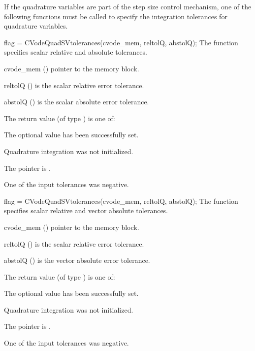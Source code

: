 If the quadrature variables are part of the step size control mechanism, 
one of the following functions must be called to specify the
integration tolerances for quadrature variables. 

{
 flag = CVodeQuadSVtolerances(cvode\_mem, reltolQ, abstolQ);
}
{
  The function  specifies scalar relative and absolute
  tolerances.
}
{
  \begin{args}
  \item[cvode\_mem] ()
    pointer to the {\cvodes} memory block.
  \item[reltolQ] ()
    is the scalar relative error tolerance.
  \item[abstolQ] ()
    is the scalar absolute error tolerance.
  \end{args}
}
{
  The return value  (of type ) is one of:
  \begin{args}
  \item[\Id{CV\_SUCCESS}] 
    The optional value has been successfully set.
  \item[\Id{CV\_NO\_QUAD}]
    Quadrature integration was not initialized.
  \item[\Id{CV\_MEM\_NULL}]
    The  pointer is .
  \item[\Id{CV\_ILL\_INPUT}] 
    One of the input tolerances was negative.
  \end{args}
}
{}

{
 flag = CVodeQuadSVtolerances(cvode\_mem, reltolQ, abstolQ);
}
{
  The function  specifies scalar relative and 
  vector absolute tolerances.
}
{
  \begin{args}
  \item[cvode\_mem] ()
    pointer to the {\cvodes} memory block.
  \item[reltolQ] ()
    is the scalar relative error tolerance.
  \item[abstolQ] ()
    is the vector absolute error tolerance.
  \end{args}
}
{
  The return value  (of type ) is one of:
  \begin{args}
  \item[\Id{CV\_SUCCESS}] 
    The optional value has been successfully set.
  \item[\Id{CV\_NO\_QUAD}]
    Quadrature integration was not initialized.
  \item[\Id{CV\_MEM\_NULL}]
    The  pointer is .
  \item[\Id{CV\_ILL\_INPUT}] 
    One of the input tolerances was negative.
  \end{args}
}
{}

